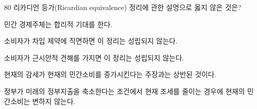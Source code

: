 \begin{question}{80}
리카디언 등가(Ricardian equivalence) 정리에 관한 설명으로 옳지 않은 것은?
\begin{choices}
  \item 민간 경제주체는 합리적 기대를 한다.
  \item 소비자가 차입 제약에 직면하면 이 정리는 성립되지 않는다.
  \item 소비자가 근시안적 견해를 가지면 이 정리는 성립되지 않는다.
  \item 현재의 감세가 현재의 민간소비를 증가시킨다는 주장과는 상반된 것이다.
  \item 정부가 미래의 정부지출을 축소한다는 조건에서 현재 조세를 줄이는 경우에 현재의 민간소비는 변하지 않는다.
\end{choices}
\end{question}
